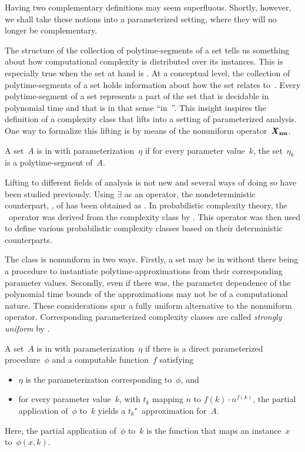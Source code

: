 Having two complementary definitions may seem superfluous.
Shortly, however, we shall take these notions into a parameterized setting, where they will no longer be complementary.

The structure of the collection of polytime-segments of a set tells us something about how computational complexity is distributed over its instances.
This is especially true when the set at hand is .
At a conceptual level, the collection of polytime-segments of a set holds information about how the set relates to~.
Every polytime-segment of a set represents a part of the set that is decidable in polynomial time and that is in that sense \enquote{in~}.
This insight inspires the definition of a complexity class that lifts  into a setting of parameterized analysis.
One way to formalize this lifting is by means of the nonuniform operator~$\textnormal{\textbf{\textit{X}$_\textbf{nu}$}}$.
\begin{definition}
  A set~$A$ is in  with parameterization~$\eta$ if for every parameter value~$k$, the set~$\eta_k$ is a polytime-segment of~$A$.
\end{definition}

Lifting  to different fields of analysis is not new and several ways of doing so have been studied previously.
Using $\exists$ as an operator, the nondeterministic counterpart, , of  has been obtained as .
In probabilistic complexity theory, the ~operator was derived from the complexity class  by \textcite{schoning1989probabilistic}.
This operator was then used to define various probabilistic complexity classes based on their deterministic counterparts.

The class  is nonuniform in two ways.
Firstly, a set may be in  without there being a procedure to instantiate polytime-approximations from their corresponding parameter values.
Secondly, even if there was, the parameter dependence of the polynomial time bounds of the approximations may not be of a computational nature.
These considerations spur a fully uniform alternative to the nonuniform \clXnu{} operator.
Corresponding parameterized complexity classes are called \emph{strongly uniform} by \textcite{downey1999parameterized}.
\begin{definition}
\label{def:xp}%
  A set~$A$ is in  with parameterization~$\eta$ if there is a direct parameterized procedure~$\phi$ and a computable function~$f$ satisfying
  \begin{itemize}
  \item $\eta$ is the parameterization corresponding to~$\phi$, and
  \item for every parameter value~$k$, with $t_k$ mapping $n$ to $f(k) \cdot n^{f(k)}$, the partial application of~$\phi$ to~$k$ yields a $t_k$"~approximation for~$A$.
  \end{itemize}
  Here, the partial application of~$\phi$ to~$k$ is the function that maps an instance~$x$ to~$\phi(x, k)$.
\end{definition}

